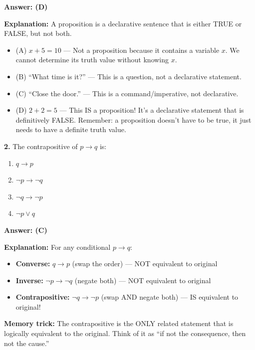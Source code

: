 \documentclass[11pt,a4paper]{article}
\begin{document}
\begin{solnbox}
\textbf{Answer: (D)}

\textbf{Explanation:} A proposition is a declarative sentence that is either TRUE or FALSE, but not both.
\begin{itemize}[noitemsep]
    \item (A) $x + 5 = 10$ --- Not a proposition because it contains a variable $x$. We cannot determine its truth value without knowing $x$.
    \item (B) ``What time is it?'' --- This is a question, not a declarative statement.
    \item (C) ``Close the door.'' --- This is a command/imperative, not declarative.
    \item (D) $2 + 2 = 5$ --- This IS a proposition! It's a declarative statement that is definitively FALSE. Remember: a proposition doesn't have to be true, it just needs to have a definite truth value.
\end{itemize}
\end{solnbox}

\vspace{10pt}

\textbf{2.} The contrapositive of $p \to q$ is:

\begin{enumerate}[label=(\Alph*),noitemsep]
    \item $q \to p$
    \item $\neg p \to \neg q$
    \item $\neg q \to \neg p$
    \item $\neg p \lor q$
\end{enumerate}

\begin{solnbox}
\textbf{Answer: (C)}

\textbf{Explanation:} For any conditional $p \to q$:
\begin{itemize}[noitemsep]
    \item \textbf{Converse:} $q \to p$ (swap the order) --- NOT equivalent to original
    \item \textbf{Inverse:} $\neg p \to \neg q$ (negate both) --- NOT equivalent to original
    \item \textbf{Contrapositive:} $\neg q \to \neg p$ (swap AND negate both) --- IS equivalent to original!
\end{itemize}

\textbf{Memory trick:} The contrapositive is the ONLY related statement that is logically equivalent to the original. Think of it as ``if not the consequence, then not the cause.''
\end{solnbox}
\end{document}
